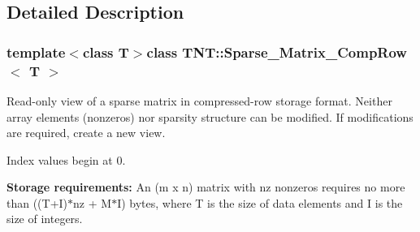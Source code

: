 \subsection{Detailed Description}
\subsubsection*{template$<$class T$>$class T\-N\-T\-::\-Sparse\-\_\-\-Matrix\-\_\-\-Comp\-Row$<$ T $>$}

Read-\/only view of a sparse matrix in compressed-\/row storage format. Neither array elements (nonzeros) nor sparsity structure can be modified. If modifications are required, create a new view.

Index values begin at 0.

{\bfseries Storage requirements\-:} An (m x n) matrix with nz nonzeros requires no more than ((T+\-I)$\ast$nz + M$\ast$\-I) bytes, where T is the size of data elements and I is the size of integers. 

